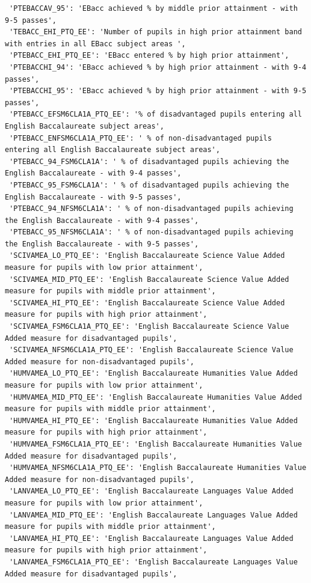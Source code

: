 \documentclass[
  letterpaper,
  DIV=11,
  numbers=noendperiod]{scrartcl}
\begin{document}
\begin{verbatim}
 'PTEBACCAV_95': 'EBacc achieved % by middle prior attainment - with 9-5 passes',
 'TEBACC_EHI_PTQ_EE': 'Number of pupils in high prior attainment band with entries in all EBacc subject areas ',
 'PTEBACC_EHI_PTQ_EE': 'EBacc entered % by high prior attainment',
 'PTEBACCHI_94': 'EBacc achieved % by high prior attainment - with 9-4 passes',
 'PTEBACCHI_95': 'EBacc achieved % by high prior attainment - with 9-5 passes',
 'PTEBACC_EFSM6CLA1A_PTQ_EE': '% of disadvantaged pupils entering all English Baccalaureate subject areas',
 'PTEBACC_ENFSM6CLA1A_PTQ_EE': ' % of non-disadvantaged pupils entering all English Baccalaureate subject areas',
 'PTEBACC_94_FSM6CLA1A': ' % of disadvantaged pupils achieving the English Baccalaureate - with 9-4 passes',
 'PTEBACC_95_FSM6CLA1A': ' % of disadvantaged pupils achieving the English Baccalaureate - with 9-5 passes',
 'PTEBACC_94_NFSM6CLA1A': ' % of non-disadvantaged pupils achieving the English Baccalaureate - with 9-4 passes',
 'PTEBACC_95_NFSM6CLA1A': ' % of non-disadvantaged pupils achieving the English Baccalaureate - with 9-5 passes',
 'SCIVAMEA_LO_PTQ_EE': 'English Baccalaureate Science Value Added measure for pupils with low prior attainment',
 'SCIVAMEA_MID_PTQ_EE': 'English Baccalaureate Science Value Added measure for pupils with middle prior attainment',
 'SCIVAMEA_HI_PTQ_EE': 'English Baccalaureate Science Value Added measure for pupils with high prior attainment',
 'SCIVAMEA_FSM6CLA1A_PTQ_EE': 'English Baccalaureate Science Value Added measure for disadvantaged pupils',
 'SCIVAMEA_NFSM6CLA1A_PTQ_EE': 'English Baccalaureate Science Value Added measure for non-disadvantaged pupils',
 'HUMVAMEA_LO_PTQ_EE': 'English Baccalaureate Humanities Value Added measure for pupils with low prior attainment',
 'HUMVAMEA_MID_PTQ_EE': 'English Baccalaureate Humanities Value Added measure for pupils with middle prior attainment',
 'HUMVAMEA_HI_PTQ_EE': 'English Baccalaureate Humanities Value Added measure for pupils with high prior attainment',
 'HUMVAMEA_FSM6CLA1A_PTQ_EE': 'English Baccalaureate Humanities Value Added measure for disadvantaged pupils',
 'HUMVAMEA_NFSM6CLA1A_PTQ_EE': 'English Baccalaureate Humanities Value Added measure for non-disadvantaged pupils',
 'LANVAMEA_LO_PTQ_EE': 'English Baccalaureate Languages Value Added measure for pupils with low prior attainment',
 'LANVAMEA_MID_PTQ_EE': 'English Baccalaureate Languages Value Added measure for pupils with middle prior attainment',
 'LANVAMEA_HI_PTQ_EE': 'English Baccalaureate Languages Value Added measure for pupils with high prior attainment',
 'LANVAMEA_FSM6CLA1A_PTQ_EE': 'English Baccalaureate Languages Value Added measure for disadvantaged pupils',

\end{verbatim}
\end{document}
